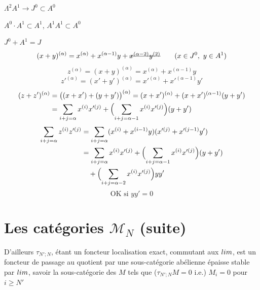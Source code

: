 \documentclass[11pt,a4paper]{article}
\begin{document}
$\Lambda^2 A^1 \longrightarrow J^0 \subset A^0$ 

$A^0 \cdot A^1 \subset A^1$, \quad $A^1 A^1 \subset A^0$

$J^0 + A^1 = J$
\[
  (x + y)^{(\alpha)} = x^{(\alpha)} + x^{(\alpha-1)} y + \text{\struck{$x^{(\alpha-2)} y^{(2)}$}}
  \qquad (x \in J^0,\ y \in A^1)
\]
\[
  z^{(\alpha)} = (x + y)^{(\alpha)} = x^{(\alpha)} + x^{(\alpha-1)} y
\]
\[
  z'^{(\alpha)} = (x' + y')^{(\alpha)} = x'^{(\alpha)} + x'^{(\alpha-1)} y'
\]
\begin{align*}
  (z + z')^{(\alpha)} &= \bigl((x + x') + (y + y')\bigr)^{(\alpha)}
    = (x + x')^{(\alpha)} + (x + x')^{(\alpha-1)} (y + y') \\
  &= \sum_{i+j=\alpha} x^{(i)} x'^{(j)} + \Bigl(\sum_{i+j=\alpha-1} x^{(i)} x'^{(j)}\Bigr)(y + y')
\end{align*}
\begin{align*}
  \sum_{i+j=\alpha} z^{(i)} z'^{(j)}
  &= \sum_{i+j=\alpha} (x^{(i)} + x^{(i-1)} y)(x'^{(j)} + x'^{(j-1)} y') \\
  &= \sum_{i+j=\alpha} x^{(i)} x'^{(j)} + \Bigl(\sum_{i+j=\alpha-1} x^{(i)} x'^{(j)}\Bigr)(y + y') \\
  &\quad + \Bigl(\sum_{i+j=\alpha-2} x^{(i)} x'^{(j)}\Bigr) y y'
\end{align*}
\[
  \boxed{\text{OK si } yy' = 0}
\]

\section{Les catégories $\mathcal{M}_N$ (suite)}

D'ailleurs $\tau_{N';N}$, étant un foncteur localisation exact, commutant aux $\varinjlim$, est un foncteur de passage au quotient par une sous-catégorie abélienne épaisse stable par $\varinjlim$, savoir la sous-catégorie des $M$ \struck{\ill{}} tels que  ($\tau_{N';N} M = 0$ i.e.) $M_i = 0$ pour $i \geq N'$
\end{document}
